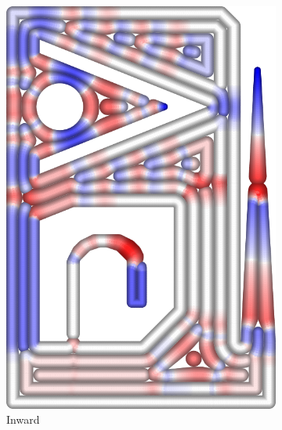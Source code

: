 \begin{figure}
\begin{subfigure}{\figwidth}
\includegraphics[width=\columnwidth]{sources-validation-gMAT-example-TEST-InwardDistributed-widths.png}
\caption{Inward }\label{TEST_InwardDistributed_accuracy}
\end{subfigure}
\begin{subfigure}{.04\columnwidth}\centering
\vspace{4.7cm}

\end{subfigure}
\end{figure}
